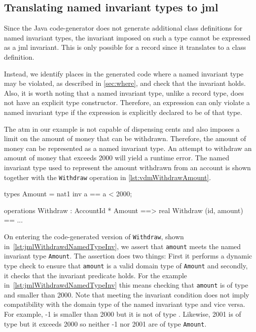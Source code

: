 \subsection{Translating named invariant types to \ac{jml}}
\label{sec:named-type-invariant}

Since the Java code-generator does not generate additional class
definitions for named invariant types, the invariant imposed on such a
type cannot be expressed as a \ac{jml} invariant. This is only
possible for a record since it translates to a class definition.

Instead, we identify places in the generated code where a named
invariant type may be violated, as described in \autoref{sec:where},
and check that the invariant holds. Also, it is worth noting that a
named invariant type, unlike a record type, does not have an explicit
type constructor. Therefore, an expression can only violate a named
invariant type if the expression is explicitly declared to be of that
type.

The \ac{atm} in our example is not capable of dispensing cents and
also imposes a limit on the amount of money that can be
withdrawn. Therefore, the amount of money can be represented as a
named invariant type. An attempt to withdraw an amount of money that
exceeds 2000 will yield a runtime error. The named invariant type used
to represent the amount withdrawn from an account is shown together
with the \texttt{Withdraw} operation in
\autoref{lst:vdmWithdrawAmount}.

\begin{vdmsl}[style=customVdm,caption={The amount to withdraw modelled
using a named invariant type.},label={lst:vdmWithdrawAmount}]
types
Amount = nat1
inv a == a < 2000;

operations
Withdraw : AccountId * Amount ==> real
Withdraw (id, amount) == ...
\end{vdmsl}

On entering the code-generated version of \texttt{Withdraw}, shown
in~\autoref{lst:jmlWithdrawdNamedTypeInv}, we assert that
\texttt{amount} meets the named invariant type \texttt{Amount}. The
assertion does two things: First it performs a dynamic type check to
ensure that \texttt{amount} is a valid domain type of \texttt{Amount}
and secondly, it checks that the invariant predicate holds. For the
example in~\autoref{lst:jmlWithdrawdNamedTypeInv} this means checking
that \texttt{amount} is of type  and smaller than 2000. Note
that meeting the invariant condition does not imply compatibility with
the domain type of the named invariant type and vice versa. For
example, -1 is smaller than 2000 but it is not of type
. Likewise, 2001 is of type  but it exceeds 2000 so
neither -1 nor 2001 are of type \texttt{Amount}.

